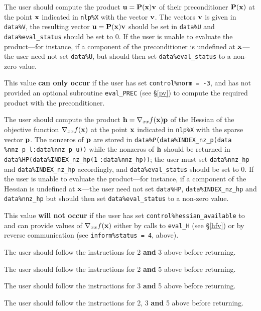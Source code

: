 \documentclass{galahad}
\begin{document}
\begin{description}
 The user should compute the product ${\mathbf{u}} = {\mathbf{P}}({\mathbf{x}}){\mathbf{v}}$
     of their preconditioner ${\mathbf{P}}({\mathbf{x}})$ at the point ${\mathbf{x}}$
     indicated in {\tt nlp\%X} with the vector ${\mathbf{v}}$.
     The vectors ${\mathbf{v}}$ is given in {\tt data\%V}, the
     resulting vector ${\mathbf{u}} = {\mathbf{P}}({\mathbf{x}}){\mathbf{v}}$ should be set in {\tt data\%U}
     and {\tt data\%eval\_status}
     should be set to 0. If the user is unable to evaluate the product---for
     instance, if a component of the preconditioner is undefined at
     ${\mathbf{x}}$---the user need not set {\tt data\%U}, but should then set
     {\tt data\%eval\_status} to a non-zero value.

     \noindent
     This value {\bf can only occur} if the user has set
     {\tt control\%norm = -3}, and has not provided an optional
     subroutine {\tt eval\_PREC} (see \S\ref{pv}) to compute the required
     product with the preconditioner.

 The user should compute the product
     ${\mathbf{h}} = \nabla_{xx} f({\mathbf{x}}){\mathbf{p}}$ of the Hessian
     of the objective function $\nabla_{xx} f({\mathbf{x}})$ at the point ${\mathbf{x}}$
     indicated in {\tt nlp\%X} with the sparse vector ${\mathbf{p}}$.
     The nonzeros of ${\mathbf{p}}$ are stored in
     {\tt data\%P(data\%INDEX\_nz\_p(data}
     {\tt \%nnz\_p\_l:data\%nnz\_p\_u))}
     while the nonzeros of ${\mathbf{h}}$ should be returned in
     {\tt data\%HP(data\%INDEX\_nz\_hp(1}
     {\tt :data\%nnz\_hp))}; the user must set
     {\tt data\%nnz\_hp} and {\tt data\%INDEX\_nz\_hp} accordingly,
     and  {\tt data\%eval\_status} should be set to 0. If the user is
     unable to evaluate the product---for instance, if a component of
     the Hessian is undefined at ${\mathbf{x}}$---the user need not set
     {\tt data\%HP}, {\tt data\%INDEX\_nz\_hp} and {\tt data\%nnz\_hp}
     but should then set {\tt data\%eval\_status} to a non-zero value.

     \noindent
     This value {\bf will not occur} if the user has set
     {\tt control\%hessian\_available} to \true\, and can provide
     values of $\nabla_{xx} f({\mathbf{x}})$  either by calls to {\tt eval\_H}
     (see \S\ref{hfv}) or by reverse communication (see
     {\tt inform\%status = 4}, above).

 The user should follow the instructions for 2 {\bf and} 3
     above before returning.

 The user should follow the instructions for 2 {\bf and} 5
     above before returning.

 The user should follow the instructions for 3 {\bf and} 5
     above before returning.

 The user should follow the instructions for 2, 3 {\bf and} 5
     above before returning.

\end{description}
\end{document}
